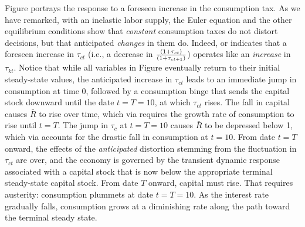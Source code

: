 \medskip{} Figure 
portrays the response to a foreseen increase in the consumption
tax.  As we have remarked, with an inelastic labor supply, the
Euler equation  and the other equilibrium conditions show
that {\it constant\/} consumption taxes do not distort decisions,
but that  anticipated {\it  changes\/} in them do. Indeed, 
or   indicates that a foreseen increase in $\tau_{ct}$
(i.e., a  decrease in ${(1+\tau_{ct})\over(1+\tau_{ct+1})}$)
operates like an {\it increase\/} in $\tau_{kt}$.  Notice that
while  all variables in Figure  eventually
return to their initial steady-state values, the anticipated
increase in $\tau_{ct}$ leads to an immediate jump in consumption
at time $0$, followed by a consumption binge that sends the
capital stock downward until the date $t=T=10$, at which
$\tau_{ct}$ rises. The fall in capital causes $\bar R$ to rise over time, which via 
requires the growth rate of consumption to rise until $t=T$.  The
jump in $\tau_c$ at $t=T=10$ causes  $\bar R$ to be depressed below 1, which via 
accounts for the drastic fall in consumption at $t=10$.  From date
$t=T$ onward, the effects of the {\it anticipated\/} distortion stemming
from the fluctuation in $\tau_{ct}$ are over, and the economy is
governed by the transient dynamic response associated with a
capital stock that is now below the appropriate  terminal steady-state
 capital stock. From date $T$ onward, capital must rise. That
requires austerity: consumption plummets at date $t=T=10$. As the
interest rate gradually falls,
  consumption grows at a diminishing rate along the path
toward the terminal steady state.

